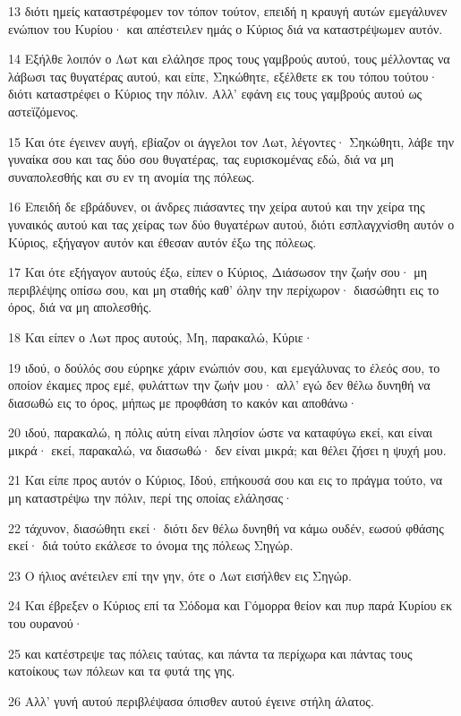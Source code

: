 \par 13 διότι ημείς καταστρέφομεν τον τόπον τούτον, επειδή η κραυγή αυτών εμεγάλυνεν ενώπιον του Κυρίου· και απέστειλεν ημάς ο Κύριος διά να καταστρέψωμεν αυτόν.
\par 14 Εξήλθε λοιπόν ο Λωτ και ελάλησε προς τους γαμβρούς αυτού, τους μέλλοντας να λάβωσι τας θυγατέρας αυτού, και είπε, Σηκώθητε, εξέλθετε εκ του τόπου τούτου· διότι καταστρέφει ο Κύριος την πόλιν. Αλλ' εφάνη εις τους γαμβρούς αυτού ως αστεϊζόμενος.
\par 15 Και ότε έγεινεν αυγή, εβίαζον οι άγγελοι τον Λωτ, λέγοντες· Σηκώθητι, λάβε την γυναίκα σου και τας δύο σου θυγατέρας, τας ευρισκομένας εδώ, διά να μη συναπολεσθής και συ εν τη ανομία της πόλεως.
\par 16 Επειδή δε εβράδυνεν, οι άνδρες πιάσαντες την χείρα αυτού και την χείρα της γυναικός αυτού και τας χείρας των δύο θυγατέρων αυτού, διότι εσπλαγχνίσθη αυτόν ο Κύριος, εξήγαγον αυτόν και έθεσαν αυτόν έξω της πόλεως.
\par 17 Και ότε εξήγαγον αυτούς έξω, είπεν ο Κύριος, Διάσωσον την ζωήν σου· μη περιβλέψης οπίσω σου, και μη σταθής καθ' όλην την περίχωρον· διασώθητι εις το όρος, διά να μη απολεσθής.
\par 18 Και είπεν ο Λωτ προς αυτούς, Μη, παρακαλώ, Κύριε·
\par 19 ιδού, ο δούλός σου εύρηκε χάριν ενώπιόν σου, και εμεγάλυνας το έλεός σου, το οποίον έκαμες προς εμέ, φυλάττων την ζωήν μου· αλλ' εγώ δεν θέλω δυνηθή να διασωθώ εις το όρος, μήπως με προφθάση το κακόν και αποθάνω·
\par 20 ιδού, παρακαλώ, η πόλις αύτη είναι πλησίον ώστε να καταφύγω εκεί, και είναι μικρά· εκεί, παρακαλώ, να διασωθώ· δεν είναι μικρά; και θέλει ζήσει η ψυχή μου.
\par 21 Και είπε προς αυτόν ο Κύριος, Ιδού, επήκουσά σου και εις το πράγμα τούτο, να μη καταστρέψω την πόλιν, περί της οποίας ελάλησας·
\par 22 τάχυνον, διασώθητι εκεί· διότι δεν θέλω δυνηθή να κάμω ουδέν, εωσού φθάσης εκεί· διά τούτο εκάλεσε το όνομα της πόλεως Σηγώρ.
\par 23 Ο ήλιος ανέτειλεν επί την γην, ότε ο Λωτ εισήλθεν εις Σηγώρ.
\par 24 Και έβρεξεν ο Κύριος επί τα Σόδομα και Γόμορρα θείον και πυρ παρά Κυρίου εκ του ουρανού·
\par 25 και κατέστρεψε τας πόλεις ταύτας, και πάντα τα περίχωρα και πάντας τους κατοίκους των πόλεων και τα φυτά της γης.
\par 26 Αλλ' γυνή αυτού περιβλέψασα όπισθεν αυτού έγεινε στήλη άλατος.
